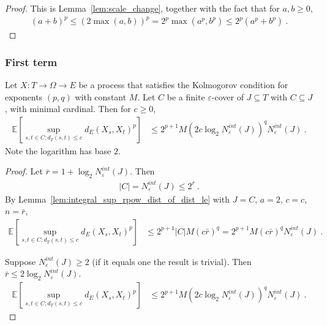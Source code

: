 \begin{proof}\leanok
This is Lemma~\ref{lem:scale_change}, together with the fact that for $a, b \ge 0$,
\begin{align*}
  (a + b)^p \le (2\max(a,b))^p = 2^p \max(a^p,b^p) \le 2^p (a^p + b^p)
  \: .
\end{align*}
\end{proof}



\subsubsection{First term}


\begin{lemma}\label{lem:integral_sup_rpow_dist_cover_of_dist_le}
  \leanok
Let $X : T \to \Omega \to E$ be a process that satisfies the Kolmogorov condition for exponents $(p,q)$ with constant $M$.
Let $C$ be a finite $\varepsilon$-cover of $J \subseteq T$ with $C \subseteq J$, with minimal cardinal.
Then for $c \ge 0$,
\begin{align*}
  \mathbb{E} \left[ \sup_{s, t \in C; d_T(s, t) \le c} d_E(X_s, X_t)^p \right]
  &\le 2^{p+1} M \left(2 c \log_2 N^{int}_{\varepsilon}(J) \right)^q  N^{int}_{\varepsilon}(J)
  \: .
\end{align*}
Note the logarithm has base $2$.
\end{lemma}

\begin{proof}\leanok
Let $\bar{r} = 1 + \log_2 N^{int}_{\varepsilon}(J)$. Then
\begin{align*}
  \vert C \vert
  = N^{int}_{\varepsilon}(J)
  \le 2^{\bar{r}}
  \: .
\end{align*}
By Lemma~\ref{lem:integral_sup_rpow_dist_of_dist_le} with $J = C$, $a = 2$, $c = c$, $n = \bar{r}$,
\begin{align*}
  \mathbb{E} \left[ \sup_{s, t \in C; d_T(s, t) \le c} d_E(X_s, X_t)^p \right]
  &\le 2^{p+1} |C| M (c \bar{r})^q
  = 2^{p+1} M (c \bar{r})^q N^{int}_{\varepsilon}(J)
  \: .
\end{align*}

Suppose $N^{int}_{\varepsilon}(J) \ge 2$ (if it equals one the result is trivial).
Then $\bar{r} \le 2 \log_2 N^{int}_{\varepsilon}(J)$.
\begin{align*}
  \mathbb{E} \left[ \sup_{s, t \in C; d_T(s, t) \le c} d_E(X_s, X_t)^p \right]
  &\le 2^{p+1} M \left(2 c \log_2 N^{int}_{\varepsilon}(J) \right)^q  N^{int}_{\varepsilon}(J)
  \: .
\end{align*}
\end{proof}

